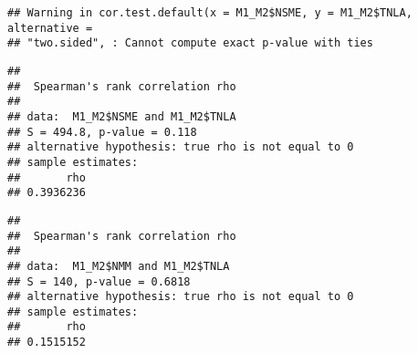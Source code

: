 \documentclass[]{article}
\newenvironment{Shaded}{\begin{snugshade}}{\end{snugshade}}
\newcommand{\KeywordTok}[1]{\textcolor[rgb]{0.13,0.29,0.53}{\textbf{{#1}}}}
\newcommand{\DataTypeTok}[1]{\textcolor[rgb]{0.13,0.29,0.53}{{#1}}}
\newcommand{\StringTok}[1]{\textcolor[rgb]{0.31,0.60,0.02}{{#1}}}
\newcommand{\CommentTok}[1]{\textcolor[rgb]{0.56,0.35,0.01}{\textit{{#1}}}}
\newcommand{\OtherTok}[1]{\textcolor[rgb]{0.56,0.35,0.01}{{#1}}}
\newcommand{\NormalTok}[1]{{#1}}
\begin{document}
\begin{Shaded}
\end{Shaded}

\begin{verbatim}
## Warning in cor.test.default(x = M1_M2$NSME, y = M1_M2$TNLA, alternative =
## "two.sided", : Cannot compute exact p-value with ties
\end{verbatim}

\begin{verbatim}
## 
##  Spearman's rank correlation rho
## 
## data:  M1_M2$NSME and M1_M2$TNLA
## S = 494.8, p-value = 0.118
## alternative hypothesis: true rho is not equal to 0
## sample estimates:
##       rho 
## 0.3936236
\end{verbatim}

\begin{Shaded}
\end{Shaded}

\begin{verbatim}
## 
##  Spearman's rank correlation rho
## 
## data:  M1_M2$NMM and M1_M2$TNLA
## S = 140, p-value = 0.6818
## alternative hypothesis: true rho is not equal to 0
## sample estimates:
##       rho 
## 0.1515152
\end{verbatim}

\begin{Shaded}
\end{Shaded}
\end{document}
